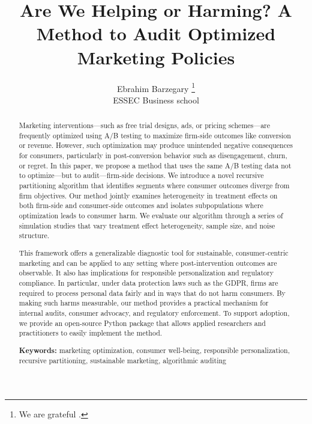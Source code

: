 \documentclass[11pt,letterpaper,english]{article}
\theoremstyle{definition}
\theoremstyle{definition}
\begin{document}
\title{Are We Helping or Harming? A Method to Audit Optimized Marketing Policies}


\author{
       Ebrahim Barzegary \thanks{We are grateful .}  \\
        ESSEC Business school\\
 }

\thispagestyle{empty}

\date{}
\maketitle

\begin{abstract} 

Marketing interventions—such as free trial designs, ads, or pricing schemes—are frequently optimized using A/B testing to maximize firm-side outcomes like conversion or revenue. However, such optimization may produce unintended negative consequences for consumers, particularly in post-conversion behavior such as disengagement, churn, or regret. In this paper, we propose a method that uses the same A/B testing data not to optimize—but to audit—firm-side decisions. We introduce a novel recursive partitioning algorithm that identifies segments where consumer outcomes diverge from firm objectives. Our method jointly examines heterogeneity in treatment effects on both firm-side and consumer-side outcomes and isolates subpopulations where optimization leads to consumer harm. We evaluate our algorithm through a series of simulation studies that vary treatment effect heterogeneity, sample size, and noise structure.

This framework offers a generalizable diagnostic tool for sustainable, consumer-centric marketing and can be applied to any setting where post-intervention outcomes are observable. It also has implications for responsible personalization and regulatory compliance. In particular, under data protection laws such as the GDPR, firms are required to process personal data fairly and in ways that do not harm consumers. By making such harms measurable, our method provides a practical mechanism for internal audits, consumer advocacy, and regulatory enforcement. To support adoption, we provide an open-source Python package that allows applied researchers and practitioners to easily implement the method.

\vspace{5mm}

\noindent \textbf{Keywords:} marketing optimization, consumer well-being, responsible personalization, recursive partitioning, sustainable marketing, algorithmic auditing

\end{abstract}
\end{document}
